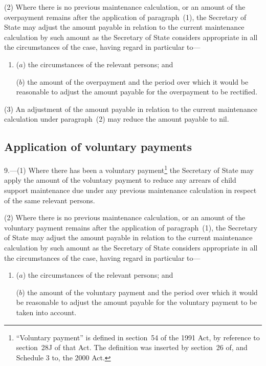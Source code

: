 \documentclass[12pt,a4paper]{article}
\begin{document}
(2) Where there is no previous maintenance calculation, or an amount of the overpayment remains after the application of paragraph~(1), the 
Secretary of State  %
may adjust the amount payable in relation to the current maintenance calculation by such amount as 
the Secretary of State  %
considers appropriate in all the circumstances of the case, having regard in particular to—
\begin{enumerate}\item[]
($a$) the circumstances of the relevant persons; and

($b$) the amount of the overpayment and the period over which it would be reasonable to adjust the amount payable for the overpayment to be rectified.
\end{enumerate}

(3) An adjustment of the amount payable in relation to the current maintenance calculation under paragraph~(2) may reduce the amount payable to nil.


\subsection[9. Application of voluntary payments]{Application of voluntary payments}

9.---(1)  Where there has been a voluntary payment\footnote{“Voluntary payment” is defined in section~54 of the 1991 Act, by reference to section~28J of that Act. The definition was inserted by section~26 of, and Schedule 3 to, the 2000 Act.} the 
Secretary of State  %
may apply the amount of the voluntary payment to reduce any arrears of child support maintenance due under any previous maintenance calculation in respect of the same relevant persons.

(2) Where there is no previous maintenance calculation, or an amount of the voluntary payment remains after the application of paragraph~(1), the 
Secretary of State  %
may adjust the amount payable in relation to the current maintenance calculation by such amount as 
the Secretary of State  %
considers appropriate in all the circumstances of the case, having regard in particular to—
\begin{enumerate}\item[]
($a$) the circumstances of the relevant persons; and

($b$) the amount of the voluntary payment and the period over which it would be reasonable to adjust the amount payable for the voluntary payment to be taken into account.
\end{enumerate}
\end{document}
